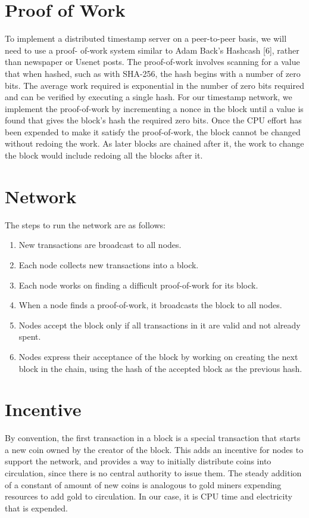 \documentclass[a4paper,12pt]{report}
\begin{document}
\section{Proof of Work}
To implement a distributed timestamp server on a peer-to-peer basis, we will need to use a proof-
of-work system similar to Adam Back's Hashcash [6], rather than newspaper or Usenet posts.
The proof-of-work involves scanning for a value that when hashed, such as with SHA-256, the
hash begins with a number of zero bits. The average work required is exponential in the number
of zero bits required and can be verified by executing a single hash.
For our timestamp network, we implement the proof-of-work by incrementing a nonce in the
block until a value is found that gives the block's hash the required zero bits. Once the CPU
effort has been expended to make it satisfy the proof-of-work, the block cannot be changed
without redoing the work. As later blocks are chained after it, the work to change the block
would include redoing all the blocks after it.

\section{Network}
The steps to run the network are as follows:
\begin{enumerate}
\item New transactions are broadcast to all nodes.
\item Each node collects new transactions into a block.
\item Each node works on finding a difficult proof-of-work for its block.
\item When a node finds a proof-of-work, it broadcasts the block to all nodes.
\item Nodes accept the block only if all transactions in it are valid and not already spent.
\item Nodes express their acceptance of the block by working on creating the next block in the chain, using the hash of the accepted block as the previous hash.
\end{enumerate}

\section{Incentive}
By convention, the first transaction in a block is a special transaction that starts a new coin owned
by the creator of the block. This adds an incentive for nodes to support the network, and provides
a way to initially distribute coins into circulation, since there is no central authority to issue them.
The steady addition of a constant of amount of new coins is analogous to gold miners expending
resources to add gold to circulation. In our case, it is CPU time and electricity that is expended.
\end{document}
